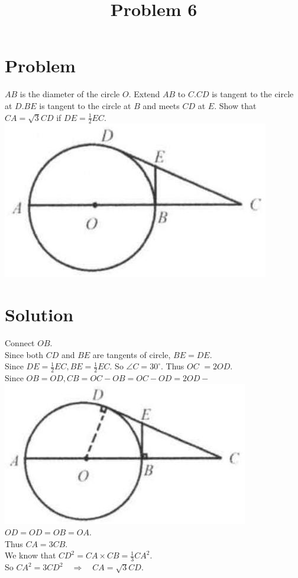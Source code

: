\documentclass{article}
\title{Problem 6}
\date{}
\begin{document}
\maketitle

\section*{Problem}
\(A B\) is the diameter of the circle \(O\). Extend \(A B\) to \(C . C D\) is tangent to the circle at \(D . B E\) is tangent to the circle at \(B\) and meets \(C D\) at \(E\). Show that \(C A=\sqrt{3} C D\) if \(D E=\frac{1}{2} E C\).\\
\centering
\includegraphics[width=\textwidth]{images/problem_image_1.jpg}

\section*{Solution}
Connect \(O B\).\\
Since both \(C D\) and \(B E\) are tangents of circle, \(B E=D E\).\\
Since \(D E=\frac{1}{2} E C, B E=\frac{1}{2} E C\). So \(\angle C=30^{\circ}\). Thus \(O C\) \(=2 O D\).\\
Since \(O B=O D, C B=O C-O B=O C-O D=2 O D-\)\\
\centering
\includegraphics[width=\textwidth]{images/reasoning_image_1.jpg}\\
\(O D=O D=O B=O A\).\\
Thus \(C A=3 C B\).\\
We know that \(C D^{2}=C A \times C B=\frac{1}{3} C A^{2}\).\\
So \(C A^{2}=3 C D^{2} \quad \Rightarrow \quad C A=\sqrt{3} C D\).
\end{document}
